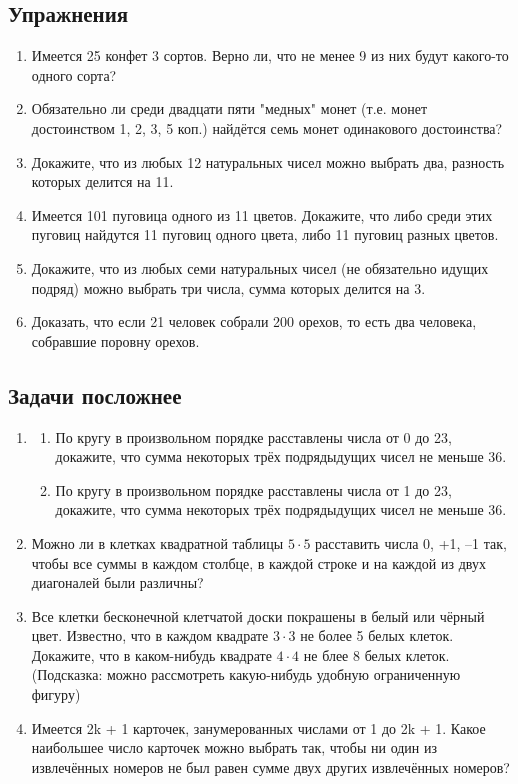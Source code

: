 \documentclass[a4paper,12pt]{article}
\begin{document}
\subsection*{Упражнения}
\begin{enumerate}
    \item Имеется 25 конфет 3 сортов. Верно ли, что не менее 9 из них будут какого-то одного сорта?
    \item Обязательно ли среди двадцати пяти "медных" монет (т.е. монет достоинством 1, 2, 3, 5 коп.) найдётся семь монет одинакового достоинства?
    \item Докажите, что из любых 12 натуральных чисел можно выбрать два, разность которых делится на 11. 
    \item Имеется 101 пуговица одного из 11 цветов. Докажите, что либо среди этих пуговиц найдутся 11 пуговиц одного цвета, либо 11 пуговиц разных цветов.
    \item Докажите, что из любых семи натуральных чисел (не обязательно идущих подряд) можно выбрать три числа, сумма которых делится на 3.
    \item Доказать, что если 21 человек собрали 200 орехов, то есть два человека, собравшие поровну орехов.
\end{enumerate}

\subsection*{Задачи посложнее}
\begin{enumerate}
    \item \begin{enumerate}
        \item По кругу в произвольном порядке расставлены числа от 0 до 23, докажите, что сумма некоторых трёх подрядыдущих чисел не меньше 36.
        \item По кругу в произвольном порядке расставлены числа от 1 до 23, докажите, что сумма некоторых трёх подрядыдущих чисел не меньше 36.
    \end{enumerate}
    \item Можно ли в клетках квадратной таблицы $5 \cdot 5$ расставить числа 0, +1, –1 так, чтобы все суммы в каждом столбце, в каждой строке и на каждой из двух диагоналей были различны? 
    \item Все клетки бесконечной клетчатой доски покрашены в белый или чёрный цвет. Известно, что в каждом квадрате $3 \cdot 3$ не более 5 белых клеток. Докажите, что в каком-нибудь квадрате $4 \cdot 4$ не блее 8 белых клеток. (Подсказка: можно рассмотреть какую-нибудь удобную ограниченную фигуру)
    \item Имеется  2k + 1  карточек, занумерованных числами от 1 до  2k + 1.  Какое наибольшее число карточек можно выбрать так, чтобы ни один из извлечённых номеров не был равен сумме двух других извлечённых номеров?
\end{enumerate}
\end{document}
